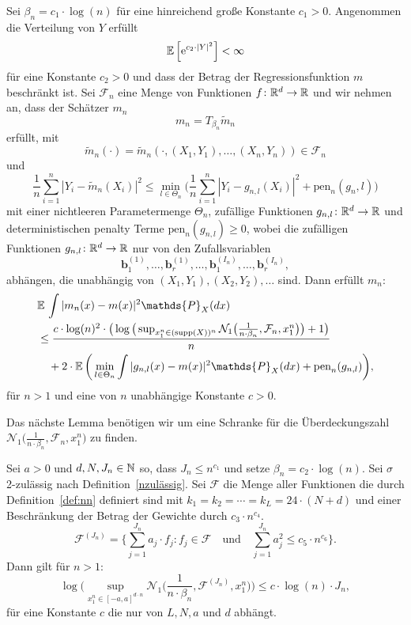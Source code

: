   \begin{lem}
  \label{lem:8}
Sei $\beta_n = c_1 \cdot \log(n)$ für eine hinreichend große Konstante $c_1 > 0$. Angenommen die Verteilung von $Y$ erfüllt 
$$ \mathbb{E}\,\Big[\mathrm{e}^{c_2 \cdot |Y|^2}\Big] < \infty$$
für eine Konstante $c_2 > 0$ und dass der Betrag der Regressionsfunktion $m$ beschränkt ist. Sei $\mathcal{F}_n$ eine Menge von Funktionen $f\colon \mathbb{R}^d \to \mathbb{R}$ und wir nehmen an, dass der Schätzer $m_n$ 
$$m_n = T_{\beta_n}\tilde{m}_n$$ 
erfüllt, mit 
$$\tilde{m}_n(\cdot) = \tilde{m}_n(\cdot,(X_1, Y_1),\dots,(X_n, Y_n)) \in \mathcal{F}_n$$
und 
$$\frac{1}{n} \sum_{i = 1}^n |Y_i - \tilde{m}_n(X_i)|^2 \leq \min_{l \in \Theta_n}\bigg(\frac{1}{n}\sum_{i = 1}^n |Y_i - g_{n,l}(X_i)|^2 + \text{pen}_n(g_n,l)\bigg)$$
mit einer nichtleeren Parametermenge $\Theta_n$, zufällige Funktionen $g_{n,l}\colon \mathbb{R}^d \to \mathbb{R}$ und deterministischen penalty Terme $\text{pen}_n(g_{n,l}) \geq 0$, wobei die zufälligen Funktionen $g_{n,l}\colon \mathbb{R}^d \to \mathbb{R}$ nur von den Zufallsvariablen
$$\mathbf{b}_1^{(1)},\dots,\mathbf{b}_r^{(1)},\dots,\mathbf{b}_1^{(I_n)},\dots,\mathbf{b}_r^{(I_n)},$$
abhängen, die unabhängig von $(X_1, Y_1), (X_2, Y_2),\dots$ sind.
Dann erfüllt $m_n\colon$
\begin{equation*}
\begin{split}
& \E \int |m_n(x) - m(x)|^2 \mathds{P}_X(dx) \\
& \leq \frac{c \cdot \log(n)^2 \cdot \big(\log\big(\sup_{x_1^n \in (\supp(X))^n}\mathcal{N}_1\big(\frac{1}{n \cdot \beta_n},\mathcal{F}_n,x_1^n\big)\big) + 1\big)}{n} \\
& \quad + 2 \cdot \E\bigg(\min_{l \in \Theta_n} \int |g_{n,l}(x) - m(x)|^2 \mathds{P}_X(dx) + \text{pen}_n(g_{n,l})\bigg),
\end{split}
\end{equation*}
für $n > 1$ und eine von $n$ unabhängige Konstante $c > 0$.
  \end{lem}
Das nächste Lemma benötigen wir um eine Schranke für die Überdeckungszahl $\mathcal{N}_1\big(\frac{1}{n \cdot \beta_n},\mathcal{F}_n,x_1^n\big)$ zu finden.
\begin{lem}
\label{lem:9}
Sei $a > 0$ und $d, N, J_n \in \mathbb{N}$ so, dass $J_n \leq n^{c_{1}}$ und setze $\beta_n = c_2 \cdot \log(n).$
Sei $\sigma$ 2-zulässig nach Definition~\ref{nzulässig}. Sei $\mathcal{F}$ die Menge aller Funktionen die durch Definition~\ref{def:nn} definiert sind mit $k_1 = k_2 = \cdots = k_L = 24 \cdot (N + d)$ und einer Beschränkung der Betrag der Gewichte durch $c_{3} \cdot n^{c_{4}}$.
$$ \mathcal{F}^{(J_n)} = \biggl\{\sum_{j = 1}^{J_n} a_j \cdot f_j : f_j \in \mathcal{F} \quad \text{und} \quad \sum_{j = 1}^{J_n} a_j^2 \leq c_{5} \cdot n^{c_{6}}\biggr\}.$$
Dann gilt für $n > 1:$
$$\log\bigg(\sup_{x_1^n\in[-a,a]^{d \cdot n}} \mathcal{N}_1\bigg(\frac{1}{n \cdot \beta_n}, \mathcal{F}^{(J_n)},x_1^n\bigg)\bigg) \leq c \cdot \log(n) \cdot J_n,$$
für eine Konstante $c$ die nur von $L, N, a$ und $d$ abhängt.
\end{lem}


